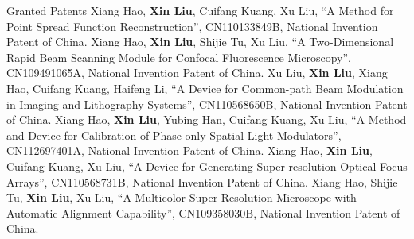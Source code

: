 \newcommand{\xin}{\textbf{Xin Liu}}
\begin{rubric}{Granted Patents}
	\entry*%
    Xiang Hao, \xin, Cuifang Kuang, Xu Liu, ``A Method for Point Spread Function Reconstruction'', CN110133849B, National Invention Patent of China.
    \entry*%
    Xiang Hao, \xin, Shijie Tu, Xu Liu, ``A Two-Dimensional Rapid Beam Scanning Module for Confocal Fluorescence Microscopy'', CN109491065A, National Invention Patent of China.
    \entry*%
    Xu Liu, \xin, Xiang Hao, Cuifang Kuang, Haifeng Li, ``A Device for Common-path Beam Modulation in Imaging and Lithography Systems'', CN110568650B, National Invention Patent of China.
    \entry*%
    Xiang Hao, \xin, Yubing Han, Cuifang Kuang, Xu Liu, ``A Method and Device for Calibration of Phase-only Spatial Light Modulators'', CN112697401A, National Invention Patent of China.
    \entry*%
    Xiang Hao, \xin, Cuifang Kuang, Xu Liu, ``A Device for Generating Super-resolution Optical Focus Arrays'', CN110568731B, National Invention Patent of China.
    \entry*%
    Xiang Hao, Shijie Tu, \xin, Xu Liu, ``A Multicolor Super-Resolution Microscope with Automatic Alignment Capability'', CN109358030B, National Invention Patent of China.
\end{rubric}